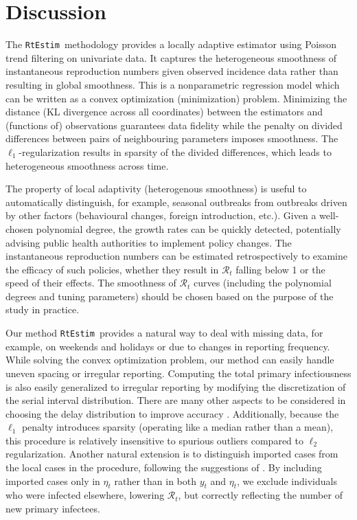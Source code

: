 \documentclass[10pt,letterpaper]{article}
\def\RtEstim{\texttt{RtEstim}}
\def\calR{\mathcal{R}}
\begin{document}
\section{Discussion}
\label{sec:disc}

The \RtEstim\ methodology provides a locally adaptive estimator using Poisson
trend filtering on univariate data. It captures the heterogeneous smoothness of
instantaneous reproduction numbers given observed incidence data rather than
resulting in global smoothness. This is a nonparametric regression model which
can be written as a convex optimization (minimization) problem. Minimizing the
distance (KL divergence across all coordinates) between the estimators and
(functions of) observations guarantees data fidelity while the penalty on divided
differences between pairs of neighbouring parameters imposes smoothness. The
$\ell_1$-regularization results in sparsity of the divided differences, which
leads to heterogeneous smoothness across time. 


The property of local adaptivity (heterogenous smoothness) is useful to
automatically distinguish, for example, seasonal outbreaks from outbreaks driven
by other factors (behavioural changes, foreign introduction, etc.). Given a
well-chosen polynomial degree, the growth rates can be quickly detected,
potentially advising public health authorities to implement policy changes. The
instantaneous reproduction numbers can be estimated retrospectively to examine
the efficacy of such policies, whether they result in $\calR_t$ falling below 1
or the speed of their effects. The smoothness of $\calR_t$ curves (including the
polynomial degrees and tuning parameters) should be chosen based on the purpose
of the study in practice. 


Our method \RtEstim\ provides a natural way to deal with missing data, for
example, on weekends and holidays or due to changes in reporting frequency.
While solving the convex optimization problem, our method can easily handle
uneven spacing or irregular reporting. Computing the total primary
infectiousness is also easily generalized to irregular reporting by modifying
the discretization of the serial interval distribution. There are many other
aspects to be considered in choosing the delay distribution to improve accuracy
\cite{park2024estimating}. Additionally, because the $\ell_1$ penalty introduces
sparsity (operating like a median rather than a mean), this procedure is
relatively insensitive to spurious outliers compared to $\ell_2$ regularization.
Another natural extension is to distinguish imported cases from the local cases
in the procedure, following the suggestions of \cite{thompson2019improved}. By
including imported cases only in $\eta_t$ rather than in both $y_t$ and
$\eta_t$, we exclude individuals who were infected elsewhere, lowering
$\calR_t$, but correctly reflecting the number of new primary infectees.
\end{document}
